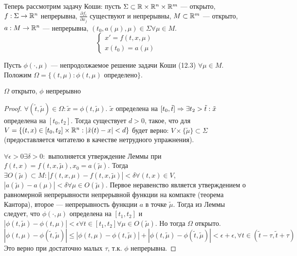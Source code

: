 Теперь рассмотрим задачу Коши: пусть \(\Sigma \subset \mathbb{R} \times \mathbb{R}^n \times \mathbb{R}^m\) --- открыто, \(f: \Sigma \rightarrow \mathbb{R}^n\) непрерывна, \(\frac{\partial f_i}{\partial x_j}\) существуют и непрерывны, \(M \subset \mathbb{R}^m\) --- открыто, \(a: M \rightarrow \mathbb{R}^n\) --- непрерывна, \((t_0, a(\mu), \mu) \in \Sigma \forall \mu \in M\).
\begin{equation}
    \begin{cases}
        x' = f(t, x, \mu) \\
        x(t_0) = a(\mu)
    \end{cases}
\end{equation}

Пусть \(\phi(\cdot, \mu)\) --- непродолжаемое решение задачи Коши (12.3) \(\forall \mu \in M\). Положим \(\Omega = \{(t, \mu): \phi(t, \mu)\text{ определено}\}\).

\begin{theorem}
    \(\Omega\) открыто, \(\phi\) непрерывно
\end{theorem}
\begin{proof}
    \(\forall (\tilde{t}, \tilde{\mu}) \in \Omega: \tilde{x} = \phi(t, \tilde{\mu})\). \(\tilde{x}\) определена на \([t_0, \tilde{t}] \Rightarrow \exists t_2 > \tilde{t}: \tilde{x}\)определена на \([t_0, t_2]\). Тогда существует \(d > 0\), такое, что для \(V = \{(t, x) \in [t_0, t_2] \times \mathbb{R}^n: |\tilde{x}(t) - x| < d\}\) будет верно: \(V \times \{\tilde{\mu}\} \subset \Sigma\) (предоставляется читателю в качестве нетрудного упражнения).
    
    \(\forall \epsilon > 0 \exists \delta > 0:\) выполняется утверждение Леммы при \(f(t, x) = f(t, x, \tilde{\mu}), x_0 = a(\tilde{\mu})\). Тогда \(\exists O(\tilde{\mu}) \subset M: |f(t, x, \mu) - f(t, x, \tilde{\mu})| < \delta \forall (t, x) \in V\), \(|a(\tilde{\mu}) - a(\mu)| < \delta \forall \mu \in O(\tilde{\mu})\). Первое неравенство является утверждением о равномерной непрерывности непрерывной функции на компакте (теорема Кантора), второе --- непрерывность функции \(a\) в точке \(\tilde{\mu}\). Тогда из Леммы следует, что \(\phi(\cdot, \mu)\) определена на \([t_1, t_2]\) и \(|\phi(t, \tilde{\mu}) - \phi(t, \mu)| < \epsilon \forall t \in [t_1, t_2] \forall \mu \in O(\tilde{\mu})\). Но тогда \(\Omega\) открыто. 
    \[|\phi(t, \mu) - \phi(\tilde{t}, \tilde{\mu})| \le |\phi(t, \mu) - \phi(t, \tilde{\mu})| + |\phi(t, \tilde{\mu}) - \phi(\tilde{t}, \tilde{\mu})| < \epsilon + \epsilon, \forall t \in (\tilde{t} - \tau, \tilde{t} + \tau)\]
    Это верно при достаточно малых \(\tau\), т.к. \(\phi\) непрерывна.
\end{proof}

